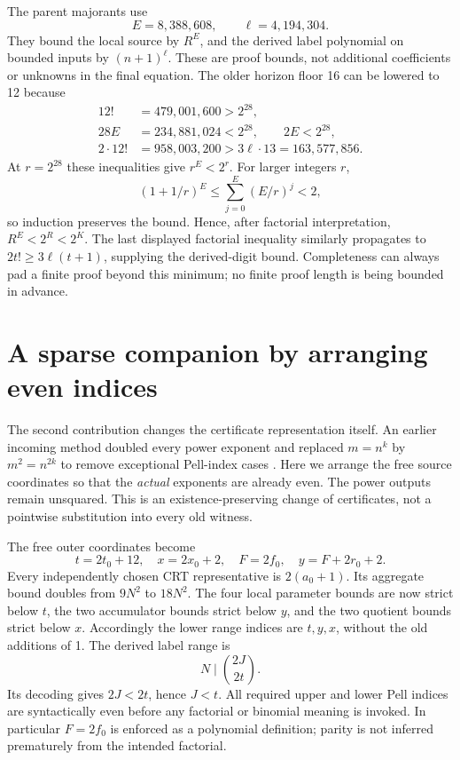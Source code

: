\documentclass[11pt,letterpaper]{article}
\theoremstyle{remark}\newtheorem{remark}[theorem]{Remark}
\begin{document}
The parent majorants use
\[
 E=8,388,608,\qquad \ell=4,194,304.
\]
They bound the local source by \(R^E\), and the derived label
polynomial on bounded inputs by \((n+1)^\ell\). These are proof
bounds, not additional coefficients or unknowns in the final equation.
The older horizon floor 16 can be lowered to 12 because
\begin{align*}
 12!&=479,001,600>2^{28},\\
 28E&=234,881,024<2^{28},\qquad 2E<2^{28},\\
 2\cdot12!&=958,003,200>3\ell\cdot13=163,577,856.
\end{align*}
At \(r=2^{28}\) these inequalities give \(r^E<2^r\).
For larger integers \(r\),
\[
 (1+1/r)^E\le\sum_{j=0}^{E}(E/r)^j<2,
\]
so induction preserves the bound. Hence, after factorial interpretation,
\(R^E<2^R<2^K\). The last displayed factorial inequality similarly
propagates to \(2t!\ge3\ell(t+1)\), supplying the derived-digit bound.
Completeness can always pad a finite proof beyond this minimum; no
finite proof length is being bounded in advance.

\section{A sparse companion by arranging even indices}
\label{sec:parity}

The second contribution changes the certificate representation itself.
An earlier incoming method doubled every power exponent and replaced
\(m=n^k\) by \(m^2=n^{2k}\) to remove exceptional Pell-index cases
\cite{even}. Here we arrange the free source coordinates so that the
\emph{actual} exponents are already even. The power outputs remain
unsquared. This is an existence-preserving change of certificates, not
a pointwise substitution into every old witness.

The free outer coordinates become
\begin{equation}
 t=2t_0+12,\quad x=2x_0+2,\quad F=2f_0,\quad
 y=F+2r_0+2. \label{eq:evenfront}
\end{equation}
Every independently chosen CRT representative is \(2(a_0+1)\).
Its aggregate bound doubles from \(9N^2\) to \(18N^2\).
The four local parameter bounds are now strict below \(t\), the two
accumulator bounds strict below \(y\), and the two quotient bounds
strict below \(x\). Accordingly the lower range indices are
\(t,y,x\), without the old additions of 1. The derived label range is
\begin{equation}
 N\mid\binom{2J}{2t}. \label{eq:evenlabels}
\end{equation}
Its decoding gives \(2J<2t\), hence \(J<t\). All required upper and
lower Pell indices are syntactically even before any factorial or
binomial meaning is invoked. In particular \(F=2f_0\) is enforced
as a polynomial definition; parity is not inferred prematurely from
the intended factorial.
\end{document}
